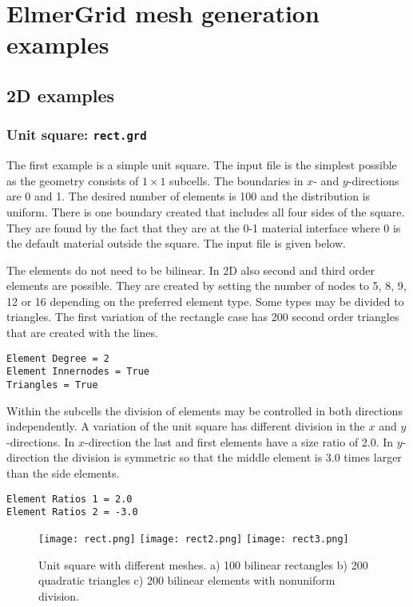 \chapter{ElmerGrid mesh generation examples}


\section{2D examples}

\subsection*{Unit square: \texttt{rect.grd}}

The first example is a simple unit square. The input file is the simplest
possible as the geometry consists of $1 \times 1$ subcells.
The boundaries in $x$- and $y$-directions are 0 and 1.
The desired number of elements is 100 and the distribution is uniform.
There is one boundary created that includes all four sides of the 
square. They are found by the fact that they are at the 0-1 material interface
where 0 is the default material outside the square. 
The input file is given below.
%

%
The elements do not need to be bilinear. In 2D also 
second and third order elements are possible. They are created by
setting the number of nodes to 5, 8, 9, 12 or 16 depending on the
preferred element type. Some types may be divided to triangles.
The first variation of the rectangle case has 200 second order 
triangles that are created with the lines. 
%
\begin{verbatim}
Element Degree = 2
Element Innernodes = True
Triangles = True
\end{verbatim}

\noindent
Within the subcells the division of elements may be controlled in both 
directions independently. A variation of the unit square has different
division in the $x$ and $y$-directions. In $x$-direction the
last and first elements have a size ratio of 2.0.
In $y$-direction the division is symmetric so that the middle element
is 3.0 times larger than the side elements.
\begin{verbatim}
Element Ratios 1 = 2.0
Element Ratios 2 = -3.0
\end{verbatim}

\begin{figure}
\begin{center}
\texttt{[image: rect.png]}
\texttt{[image: rect2.png]}
\texttt{[image: rect3.png]}
\end{center}
\caption{Unit square with different meshes. a) 100 bilinear rectangles
b) 200 quadratic triangles c) 200 bilinear elements with nonuniform 
division.}
\label{pic1}
\end{figure}

